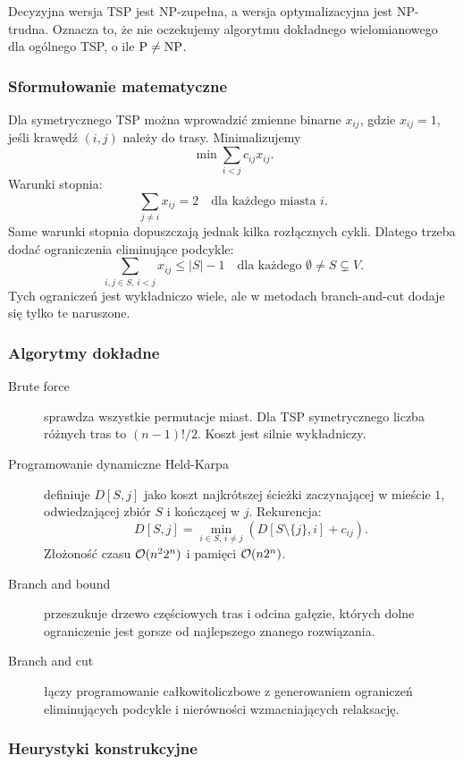 Decyzyjna wersja TSP jest NP-zupełna, a wersja optymalizacyjna jest NP-trudna. Oznacza to, że nie oczekujemy algorytmu dokładnego wielomianowego dla ogólnego TSP, o ile $\mathrm{P}\ne\mathrm{NP}$.

\subsubsection{Sformułowanie matematyczne}

Dla symetrycznego TSP można wprowadzić zmienne binarne $x_{ij}$, gdzie $x_{ij}=1$, jeśli krawędź $(i,j)$ należy do trasy. Minimalizujemy
\[
\min \sum_{i<j} c_{ij}x_{ij}.
\]
Warunki stopnia:
\[
\sum_{j\ne i} x_{ij}=2\quad\text{dla każdego miasta }i.
\]
Same warunki stopnia dopuszczają jednak kilka rozłącznych cykli. Dlatego trzeba dodać ograniczenia eliminujące podcykle:
\[
\sum_{i,j\in S,\,i<j}x_{ij}\le |S|-1
\quad\text{dla każdego } \emptyset\ne S\subsetneq V.
\]
Tych ograniczeń jest wykładniczo wiele, ale w metodach branch-and-cut dodaje się tylko te naruszone.

\subsubsection{Algorytmy dokładne}

\begin{description}
  \item[Brute force] sprawdza wszystkie permutacje miast. Dla TSP symetrycznego liczba różnych tras to $(n-1)!/2$. Koszt jest silnie wykładniczy.
  \item[Programowanie dynamiczne Held-Karpa] definiuje $D[S,j]$ jako koszt najkrótszej ścieżki zaczynającej w mieście $1$, odwiedzającej zbiór $S$ i kończącej w $j$. Rekurencja:
  \[
  D[S,j]=\min_{i\in S,\,i\ne j}\left(D[S\setminus\{j\},i]+c_{ij}\right).
  \]
  Złożoność czasu $\mathcal{O}(n^2 2^n)$ i pamięci $\mathcal{O}(n2^n)$.
  \item[Branch and bound] przeszukuje drzewo częściowych tras i odcina gałęzie, których dolne ograniczenie jest gorsze od najlepszego znanego rozwiązania.
  \item[Branch and cut] łączy programowanie całkowitoliczbowe z generowaniem ograniczeń eliminujących podcykle i nierówności wzmacniających relaksację.
\end{description}

\subsubsection{Heurystyki konstrukcyjne}

